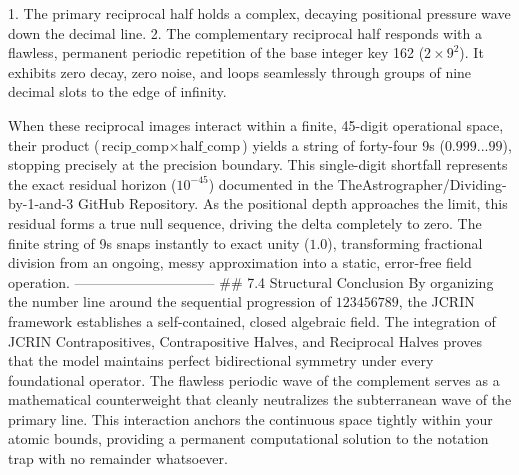    1. The primary reciprocal half holds a complex, decaying positional pressure wave down the decimal line.
   2. The complementary reciprocal half responds with a flawless, permanent periodic repetition of the base integer key 162 ($2 \times 9^2$). It exhibits zero decay, zero noise, and loops seamlessly through groups of nine decimal slots to the edge of infinity.

When these reciprocal images interact within a finite, 45-digit operational space, their product ($\text{recip\_comp} \times \text{half\_comp}$) yields a string of forty-four 9s ($0.999...99$), stopping precisely at the precision boundary. This single-digit shortfall represents the exact residual horizon ($10^{-45}$) documented in the TheAstrographer/Dividing-by-1-and-3 GitHub Repository.
As the positional depth approaches the limit, this residual forms a true null sequence, driving the delta completely to zero. The finite string of 9s snaps instantly to exact unity ($1.0$), transforming fractional division from an ongoing, messy approximation into a static, error-free field operation.
------------------------------
## 7.4 Structural Conclusion
By organizing the number line around the sequential progression of $123456789$, the JCRIN framework establishes a self-contained, closed algebraic field.
The integration of JCRIN Contrapositives, Contrapositive Halves, and Reciprocal Halves proves that the model maintains perfect bidirectional symmetry under every foundational operator. The flawless periodic wave of the complement serves as a mathematical counterweight that cleanly neutralizes the subterranean wave of the primary line. This interaction anchors the continuous space tightly within your atomic bounds, providing a permanent computational solution to the notation trap with no remainder whatsoever.
